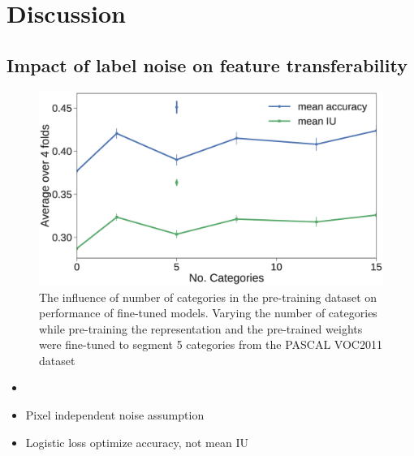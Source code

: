 \section{Discussion}
\label{sec:results}

\subsection{Impact of label noise on feature transferability}


\begin{figure}[t]
\centering
   \includegraphics[width=1.\linewidth]{img/num_classes.eps}
\caption{
The influence of number of categories in the pre-training dataset on performance of fine-tuned models.
Varying the number of categories while pre-training the representation and the pre-trained weights were fine-tuned to segment 5 categories from the PASCAL VOC2011 dataset
}
\label{fig:categories}
\end{figure}


\begin{itemize}
  \item
  \item Pixel independent noise assumption
  \item Logistic loss optimize accuracy, not mean IU
\end{itemize}
